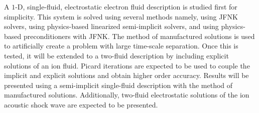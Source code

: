 \documentclass{report}
\begin{document}
A $1$-D, single-fluid, electrostatic electron fluid description is
studied first for simplicity. This system is solved using several
methods namely, using JFNK solvers, using physics-based linearized
semi-implicit solvers, and using physics-based preconditioners with
JFNK. The method of manufactured solutions is used to artificially
create a problem with large time-scale separation. Once this is
tested, it will be extended to a two-fluid description by including
explicit solutions of an ion fluid. Picard iterations are expected to
be used to couple the implicit and explicit solutions and obtain
higher order accuracy. Results will be presented using a semi-implicit
single-fluid description with the method of manufactured
solutions. Additionally, two-fluid electrostatic solutions of the ion
acoustic shock wave are expected to be presented.
\end{document}
